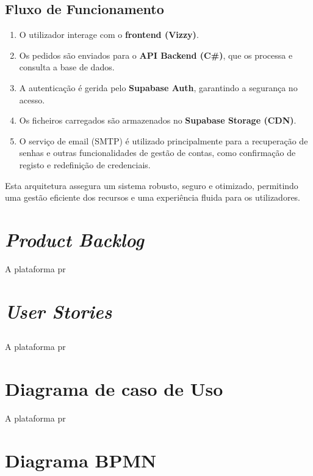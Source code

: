 \documentclass[a4paper, 12pt]{article} %
\begin{document}
\subsection{Fluxo de Funcionamento}
\begin{enumerate}
	\item O utilizador interage com o \textbf{frontend (Vizzy)}.
	\item Os pedidos são enviados para o \textbf{API Backend (C\#)}, que os processa e consulta a base de dados.
	\item A autenticação é gerida pelo \textbf{Supabase Auth}, garantindo a segurança no acesso.
	\item Os ficheiros carregados são armazenados no \textbf{Supabase Storage (CDN)}.
	\item O serviço de email (SMTP) é utilizado principalmente para a recuperação de senhas e outras funcionalidades de gestão de contas, como confirmação de registo e redefinição de credenciais.
\end{enumerate}

Esta arquitetura assegura um sistema robusto, seguro e otimizado, permitindo uma gestão eficiente dos recursos e uma experiência fluida para os utilizadores.

\newpage
\section*{\textit{Product Backlog}}

A plataforma pr

\newpage
\section*{\textit{User Stories}}
\subsection{}
A plataforma pr

\newpage
\section*{Diagrama de caso de Uso}

A plataforma pr
\newpage
\section*{Diagrama BPMN}
\end{document}
